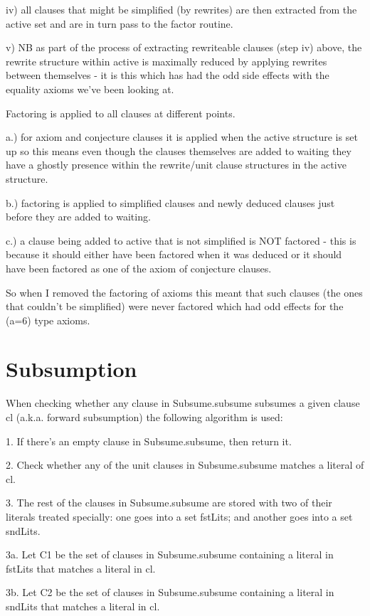 \documentclass[11pt, oneside]{article}   	%
\begin{document}
iv) all clauses that might be simplified (by rewrites) are then extracted from the active set and are in turn pass to the factor routine.

v) NB as part of the process of extracting rewriteable clauses (step iv) above, the rewrite structure within active is maximally reduced by applying rewrites between themselves - it is this which has had the odd side effects with the equality axioms we've been looking at.


Factoring is applied to all clauses at different points.

a.) for axiom and conjecture clauses it is applied when the active structure is set up so this means even though the clauses themselves are added to waiting they have a ghostly presence within the rewrite/unit clause structures in the active structure.

b.) factoring is applied to simplified clauses and newly deduced clauses just before they are added to waiting.

c.) a clause being added to active that is not simplified is NOT factored - this is because it should either have been factored when it was deduced or it should have been factored as one of the axiom of conjecture clauses.

So when I removed the factoring of axioms this meant that such clauses (the ones that couldn't be simplified) were never factored which had odd effects for the (a=6) type axioms.

\section{Subsumption}

When checking whether any
clause in Subsume.subsume subsumes a given clause cl (a.k.a. forward
subsumption) the following algorithm is used:

1. If there's an empty clause in Subsume.subsume, then return it.

2. Check whether any of the unit clauses in Subsume.subsume matches a
literal of cl.

3. The rest of the clauses in Subsume.subsume are stored with two of
their literals treated specially: one goes into a set fstLits; and
another goes into a set sndLits.

3a. Let C1 be the set of clauses in Subsume.subsume containing a
literal in fstLits that matches a literal in cl.

3b. Let C2 be the set of clauses in Subsume.subsume containing a
literal in sndLits that matches a literal in cl.
\end{document}
